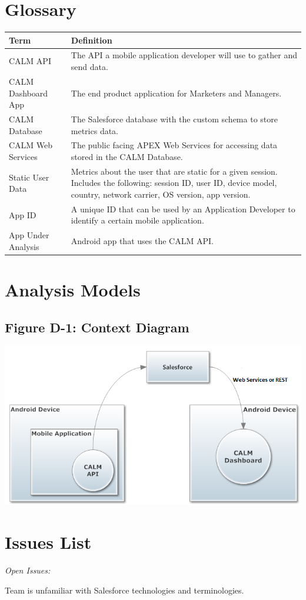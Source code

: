\documentclass[12pt,oneside,letterpaper]{article}
\newenvironment{packed_enumerate}{ %
\vspace{-7mm}
\begin{enumerate}
  \setlength{\itemsep}{0pt}
  \setlength{\parskip}{0pt}
  \setlength{\parsep}{0pt}
}{\end{enumerate}
\vspace{-8mm}}
\begin{document}


\appendix
\section{Glossary}
\begin{longtable}{|l|p{3.8in}|}
\hline
\textbf{Term}&\textbf{Definition}\\
\hline
CALM API&The API a mobile application developer will use to gather and 
send data.\\
\hline
CALM Dashboard App&The end product application for Marketers and Managers.\\
\hline
CALM Database&The Salesforce database with the custom schema to store metrics data.\\
\hline
CALM Web Services&The public facing APEX Web Services for accessing data stored in the CALM Database.\\
\hline
Static User Data&Metrics about the user that are static for a given session. Includes the following: session ID, user ID, device model, country, network carrier, OS version, app version.\\
\hline
App ID&A unique ID that can be used by an Application Developer to identify a certain mobile application.\\
\hline
App Under Analysis&Android app that uses the CALM API.\\
\hline
\end{longtable}

\section{Analysis Models}
\subsection{Figure D-1: Context Diagram}
\includegraphics[scale=0.6]{context_diagram.png}

\section{Issues List}
\textit{Open Issues:}\\
\begin{packed_enumerate}
\item Team is unfamiliar with Salesforce technologies and 
terminologies.
\end{packed_enumerate}
\end{document}
